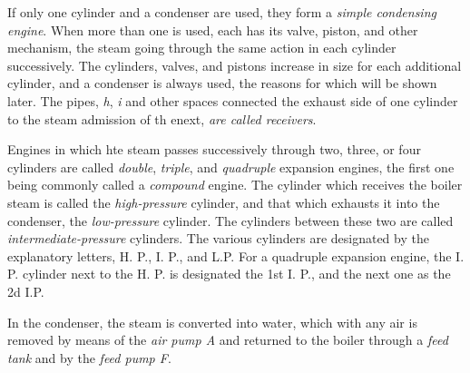 \documentclass[11pt, a5paper]{book}
\begin{document}
If only one cylinder and a condenser are used, they form a
\textit{simple condensing engine}.  When more than one is used, each
has its valve, piston, and other mechanism, the steam going through
the same action in each cylinder successively.  The cylinders, valves,
and pistons increase in size for each additional cylinder, and a
condenser is always used, the reasons for which will be shown later.
The pipes, \textit{h}, \textit{i} and other spaces connected the
exhaust side of one cylinder to the steam admission of th enext,
\textit{are called receivers}.\par

Engines in which hte steam passes successively through two, three, or
four cylinders are called \textit{double}, \textit{triple}, and
\textit{quadruple} expansion engines, the first one being commonly
called a \textit{compound} engine.  The cylinder which receives the
boiler steam is called the \textit{high-pressure} cylinder, and that
which exhausts it into the condenser, the \textit{low-pressure}
cylinder.  The cylinders between these two are called
\textit{intermediate-pressure} cylinders.  The various cylinders are
designated by the explanatory letters, H. P., I. P., and L.P\@.  For a
quadruple expansion engine, the I. P. cylinder next to the H. P. is
designated the 1st I. P., and the next one as the 2d I.P.\par

In the condenser, the steam is converted into water, which with any
air is removed by means of the \textit{air pump A} and returned to the
boiler through a \textit{feed tank} and by the \textit{feed pump F}.\par
\end{document}
